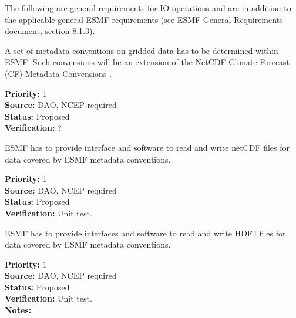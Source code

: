 

The following are general requirements for IO operations and are in
addition to the applicable general ESMF requirements (see ESMF General 
Requirements document, section 8.1.3).


A set of metadata conventions on gridded data has to be determined
within ESMF. Such convensions will be an extension of the NetCDF 
Climate-Forecast (CF) Metadata Convensions \cite{NetCDF_CF_v1_beta3}.


\begin{reqlist}
{\bf Priority:} 1 \\
{\bf Source:} DAO, NCEP required \\
{\bf Status:} Proposed \\
{\bf Verification:} ? \\
\end{reqlist}



ESMF has to provide interface and software to read and write netCDF
files for data covered by ESMF metadata conventions. 

\begin{reqlist}
{\bf Priority:} 1 \\
{\bf Source:} DAO, NCEP required \\
{\bf Status:} Proposed \\
{\bf Verification:} Unit test. \\
\end{reqlist}


ESMF has to provide interfaces and software to read and write HDF4
files for data covered by ESMF metadata conventions. 

\begin{reqlist}
{\bf Priority:} 1 \\
{\bf Source:} DAO, NCEP required \\
{\bf Status:} Proposed \\
{\bf Verification:} Unit test. \\
{\bf Notes:}
\end{reqlist}

